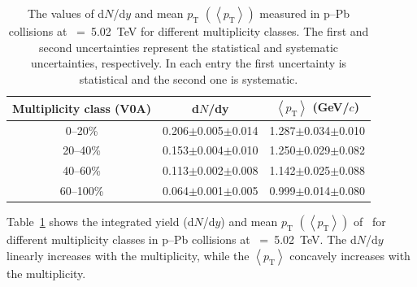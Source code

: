 \begin{table}[h!]
\caption{The values of d$N$/d$y$ and mean $p_{\mathrm{T}}$ $\left( \left\langle p_{\mathrm{T}} \right\rangle \right)$ measured in p--Pb collisions at \snn~=~5.02~TeV for different multiplicity classes. The first and second uncertainties represent the statistical and systematic uncertainties, respectively. In each entry the first uncertainty is statistical and the second one is systematic. }
\centering
\begin{tabular}{ccc}
\hline 
Multiplicity class (V0A) & d$N$/dy & $\left\langle p_{\mathrm{T}} \right\rangle$ (GeV/$c$) \\ \hline
0--20\% & 0.206$\pm$0.005$\pm$0.014 & 1.287$\pm$0.034$\pm$0.010 \\
20--40\% & 0.153$\pm$0.004$\pm$0.010 & 1.250$\pm$0.029$\pm$0.082 \\
40--60\% & 0.113$\pm$0.002$\pm$0.008 & 1.142$\pm$0.025$\pm$0.088 \\
60--100\% & 0.064$\pm$0.001$\pm$0.005 & 0.999$\pm$0.014$\pm$0.080 \\
\hline
\end{tabular}
\label{tab:ymp}
\end{table}

Table~\ref{tab:ymp} shows the integrated yield (d$N$/d$y$) and mean $p_{\mathrm{T}}$ $\left( \left\langle p_{\mathrm{T}} \right\rangle \right)$ of \fzero~for different multiplicity classes in p--Pb collisions at \snn~=~5.02~TeV. The d$N$/d$y$ linearly increases with the multiplicity, while the $\left\langle p_{\mathrm{T}} \right\rangle$ concavely increases with the multiplicity. 

